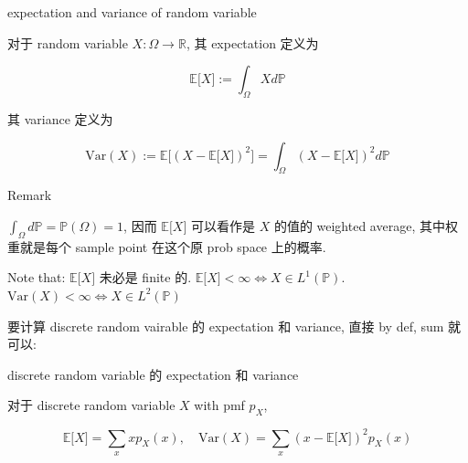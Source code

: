 \documentclass{qlnotes-export}
\begin{document}
\begin{definition}{expectation and variance of random variable}\label{def-02-random-variables-expectation-and-variance-of-random-variable}

对于 random variable \(X:\Omega\rightarrow{\mathbb{R}}\), 其 expectation 定义为

\[{\mathbb{E}}\lbrack X\rbrack := \int_{\Omega}X d{\mathbb{P}}\]

其 variance 定义为

\[\text{Var}(X) := {\mathbb{E}}\lbrack(X - {\mathbb{E}}\lbrack X\rbrack)^{2}\rbrack = \int_{\Omega}(X - {\mathbb{E}}\lbrack X\rbrack)^{2} d{\mathbb{P}}\]

\end{definition}

\begin{qlremark}{Remark}

\(\int_{\Omega}d{\mathbb{P}} = {\mathbb{P}}(\Omega) = 1\), 因而 \({\mathbb{E}}\lbrack X\rbrack\) 可以看作是 \(X\) 的值的 weighted average, 其中权重就是每个 sample point 在这个原 prob space 上的概率.

Note that: \({\mathbb{E}}\lbrack X\rbrack\) 未必是 finite 的. \({\mathbb{E}}\lbrack X\rbrack < \infty\Leftrightarrow X \in L^{1}({\mathbb{P}})\). \(\text{Var}(X) < \infty\Leftrightarrow X \in L^{2}({\mathbb{P}})\)

\end{qlremark}

要计算 discrete random vairable 的 expectation 和 variance, 直接 by def, sum 就可以:

\begin{proposition}{discrete random variable 的 expectation 和 variance}\label{prop-02-random-variables-discrete-random-variable-expectation-variance}

对于 discrete random variable \(X\) with pmf \(p_{X}\),

\[{\mathbb{E}}\lbrack X\rbrack = \sum\limits_{x}xp_{X}(x),\quad\text{Var}(X) = \sum\limits_{x}(x - {\mathbb{E}}\lbrack X\rbrack)^{2}p_{X}(x)\]

\end{proposition}
\end{document}
